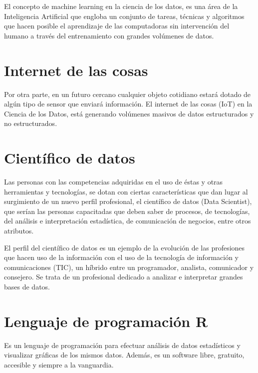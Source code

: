 \documentclass[
]{book}
\begin{document}
El concepto de machine learning en la ciencia de los datos, es una área de la Inteligencia Artificial que engloba un conjunto de tareas, técnicas y algoritmos que hacen posible el aprendizaje de las computadoras sin intervención del humano a través del entrenamiento con grandes volúmenes de datos.

\hypertarget{internet-de-las-cosas}{%
\section{Internet de las cosas}\label{internet-de-las-cosas}}

Por otra parte, en un futuro cercano cualquier objeto cotidiano estará dotado de algún tipo de sensor que enviará información. El internet de las cosas (IoT) en la Ciencia de los Datos, está generando volúmenes masivos de datos estructurados y no estructurados.

\hypertarget{cientuxedfico-de-datos}{%
\section{Científico de datos}\label{cientuxedfico-de-datos}}

Las personas con las competencias adquiridas en el uso de éstas y otras herramientas y tecnologías, se dotan con ciertas características que dan lugar al surgimiento de un nuevo perfil profesional, el científico de datos (Data Scientist), que serían las personas capacitadas que deben saber de procesos, de tecnologías, del análisis e interpretación estadística, de comunicación de negocios, entre otros atributos.

El perfil del científico de datos es un ejemplo de la evolución de las profesiones que hacen uso de la información con el uso de la tecnología de información y comunicaciones (TIC), un híbrido entre un programador, analista, comunicador y consejero. Se trata de un profesional dedicado a analizar e interpretar grandes bases de datos.

\hypertarget{lenguaje-de-programaciuxf3n-r}{%
\section{Lenguaje de programación R}\label{lenguaje-de-programaciuxf3n-r}}

Es un lenguaje de programación para efectuar análisis de datos estadísticos y visualizar gráficas de los mismos datos. Además, es un software libre, gratuito, accesible y siempre a la vanguardia.
\end{document}
